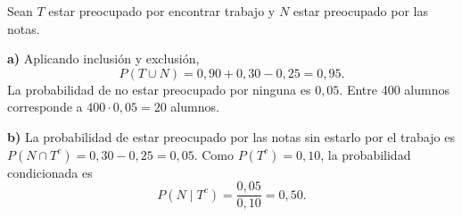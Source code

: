 Sean $T$ estar preocupado por encontrar trabajo y $N$ estar preocupado por las notas.

\textbf{a)} Aplicando inclusión y exclusión,
\[
 P(T\cup N)=0{,}90+0{,}30-0{,}25=0{,}95.
\]
La probabilidad de no estar preocupado por ninguna es $0{,}05$. Entre 400 alumnos corresponde a $400\cdot0{,}05=\boxed{20}$ alumnos.

\textbf{b)} La probabilidad de estar preocupado por las notas sin estarlo por el trabajo es $P(N\cap T^c)=0{,}30-0{,}25=0{,}05$. Como $P(T^c)=0{,}10$, la probabilidad condicionada es
\[
 P(N\mid T^c)=\frac{0{,}05}{0{,}10}=\boxed{0{,}50}.
\]
